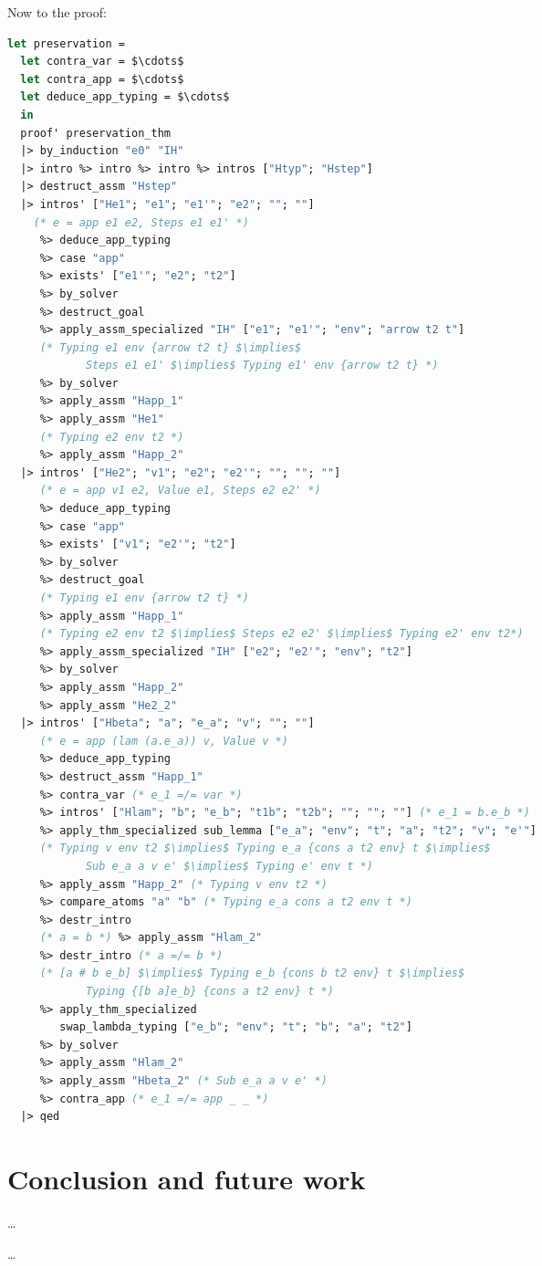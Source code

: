 \documentclass[english, mgr]{iithesis}
\begin{document}
Now to the proof:
\begin{lstlisting}[mathescape, language=OCaml]
let preservation =
  let contra_var = $\cdots$
  let contra_app = $\cdots$
  let deduce_app_typing = $\cdots$
  in
  proof' preservation_thm
  |> by_induction "e0" "IH"
  |> intro %> intro %> intro %> intros ["Htyp"; "Hstep"]
  |> destruct_assm "Hstep"
  |> intros' ["He1"; "e1"; "e1'"; "e2"; ""; ""]
    (* e = app e1 e2, Steps e1 e1' *)
     %> deduce_app_typing
     %> case "app"
     %> exists' ["e1'"; "e2"; "t2"]
     %> by_solver
     %> destruct_goal
     %> apply_assm_specialized "IH" ["e1"; "e1'"; "env"; "arrow t2 t"]
     (* Typing e1 env {arrow t2 t} $\implies$
            Steps e1 e1' $\implies$ Typing e1' env {arrow t2 t} *)
     %> by_solver
     %> apply_assm "Happ_1"
     %> apply_assm "He1"
     (* Typing e2 env t2 *)
     %> apply_assm "Happ_2"
  |> intros' ["He2"; "v1"; "e2"; "e2'"; ""; ""; ""]
     (* e = app v1 e2, Value e1, Steps e2 e2' *)
     %> deduce_app_typing
     %> case "app"
     %> exists' ["v1"; "e2'"; "t2"]
     %> by_solver
     %> destruct_goal
     (* Typing e1 env {arrow t2 t} *)
     %> apply_assm "Happ_1"
     (* Typing e2 env t2 $\implies$ Steps e2 e2' $\implies$ Typing e2' env t2*)
     %> apply_assm_specialized "IH" ["e2"; "e2'"; "env"; "t2"]
     %> by_solver
     %> apply_assm "Happ_2"
     %> apply_assm "He2_2"
  |> intros' ["Hbeta"; "a"; "e_a"; "v"; ""; ""]
     (* e = app (lam (a.e_a)) v, Value v *)
     %> deduce_app_typing
     %> destruct_assm "Happ_1"
     %> contra_var (* e_1 =/= var *)
     %> intros' ["Hlam"; "b"; "e_b"; "t1b"; "t2b"; ""; ""; ""] (* e_1 = b.e_b *)
     %> apply_thm_specialized sub_lemma ["e_a"; "env"; "t"; "a"; "t2"; "v"; "e'"]
     (* Typing v env t2 $\implies$ Typing e_a {cons a t2 env} t $\implies$
            Sub e_a a v e' $\implies$ Typing e' env t *)
     %> apply_assm "Happ_2" (* Typing v env t2 *)
     %> compare_atoms "a" "b" (* Typing e_a cons a t2 env t *)
     %> destr_intro
     (* a = b *) %> apply_assm "Hlam_2"
     %> destr_intro (* a =/= b *)
     (* [a # b e_b] $\implies$ Typing e_b {cons b t2 env} t $\implies$
            Typing {[b a]e_b} {cons a t2 env} t *)
     %> apply_thm_specialized
        swap_lambda_typing ["e_b"; "env"; "t"; "b"; "a"; "t2"]
     %> by_solver
     %> apply_assm "Hlam_2"
     %> apply_assm "Hbeta_2" (* Sub e_a a v e' *)
     %> contra_app (* e_1 =/= app _ _ *)
  |> qed
\end{lstlisting}


\chapter{Conclusion and future work}

\dots


\begin{thebibliography}{1}
 \ldots
\end{thebibliography}
\end{document}
